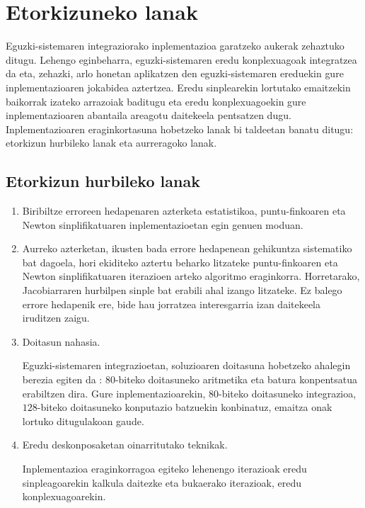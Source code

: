 \section*{Etorkizuneko lanak}

Eguzki-sistemaren integraziorako inplementazioa garatzeko aukerak zehaztuko ditugu. Lehengo eginbeharra, eguzki-sistemaren eredu konplexuagoak integratzea da eta, zehazki, arlo honetan  aplikatzen den eguzki-sistemaren ereduekin \cite{Laskar2011} gure inplementazioaren jokabidea aztertzea. Eredu sinplearekin lortutako emaitzekin baikorrak izateko arrazoiak baditugu eta eredu konplexuagoekin gure inplementazioaren abantaila areagotu daitekeela pentsatzen dugu. Inplementazioaren eraginkortasuna hobetzeko lanak bi taldeetan banatu ditugu: etorkizun hurbileko lanak eta aurreragoko lanak.

\subsection*{Etorkizun hurbileko lanak}

\begin{enumerate}
\item Biribiltze erroreen hedapenaren azterketa estatistikoa, puntu-finkoaren eta Newton sinplifikatuaren inplementazioetan egin genuen moduan.


\item Aurreko azterketan, ikusten bada errore hedapenean gehikuntza sistematiko bat dagoela, hori ekiditeko aztertu beharko litzateke puntu-finkoaren eta Newton sinplifikatuaren iterazioen arteko algoritmo eraginkorra. Horretarako,  Jacobiarraren hurbilpen sinple bat erabili ahal izango litzateke. Ez balego errore hedapenik ere, bide hau jorratzea interesgarria izan daitekeela iruditzen zaigu.

\item Doitasun nahasia.

Eguzki-sistemaren integrazioetan, soluzioaren doitasuna hobetzeko ahalegin berezia egiten da \cite{Laskar2015}: $80$-biteko doitasuneko aritmetika eta batura konpentsatua erabiltzen dira. Gure inplementazioarekin, $80$-biteko doitasuneko integrazioa, $128$-biteko doitasuneko konputazio batzuekin konbinatuz, emaitza onak lortuko ditugulakoan gaude. 

\item Eredu deskonposaketan oinarritutako teknikak.

Inplementazioa eraginkorragoa egiteko lehenengo iterazioak eredu sinpleagoarekin kalkula daitezke eta bukaerako iterazioak, eredu konplexuagoarekin. 

\end{enumerate}


